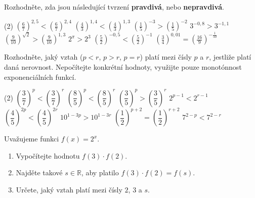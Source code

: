 \documentclass[12pt,a4paper]{article}
\begin{document}
\begin{exercise}
Rozhodněte, zda jsou následující tvrzení \textbf{pravdivá}, nebo \textbf{nepravdivá}.

\begin{tasks}(2)
    \task $\left(\frac{6}{7}\right)^{2{,}5} < \left(\frac{6}{7}\right)^{2{,}4}$
    \task $\left(\frac{4}{3}\right)^{1{,}4} < \left(\frac{4}{3}\right)^{1{,}3}$
    \task $\left(\frac{1}{5}\right)^{-3} > \left(\frac{1}{5}\right)^{-2}$
    \task $3^{-0{,}8} > 3^{-1{,}1}$
    \task $\left(\frac{9}{10}\right)^{\sqrt{2}} > \left(\frac{9}{10}\right)^{1{,}3}$
    \task $2^{\pi} > 2^{3}$
    \task $\left(\frac{5}{2}\right)^{-0{,}5} < \left(\frac{5}{2}\right)^{-1}$
    \task $\left(\frac{3}{4}\right)^{0{,}01} = \left(\frac{16}{9}\right)^{-\frac{1}{50}}$
\end{tasks}
\end{exercise}


\begin{exercise}
Rozhodněte, jaký vztah ($p<r$, $p>r$, $p=r$) platí mezi čísly $p$ a $r$,
jestliže platí daná nerovnost. Nepočítejte konkrétní hodnoty, využijte pouze
monotónnost exponenciálních funkcí.

\begin{tasks}(2)
    \task $\left(\dfrac{3}{7}\right)^{p} < \left(\dfrac{3}{7}\right)^{r}$
    \task $\left(\dfrac{8}{5}\right)^{p} < \left(\dfrac{8}{5}\right)^{r}$
    \task $\left(\dfrac{3}{5}\right)^{p} > \left(\dfrac{3}{5}\right)^{r}$
    \task $2^{p-1} < 2^{r-1}$
    \task $\left(\dfrac{4}{5}\right)^{2p} < \left(\dfrac{4}{5}\right)^{2r}$
    \task $10^{1-3p} > 10^{1-3r}$
    \task $\left(\dfrac{1}{2}\right)^{p+2} = \left(\dfrac{1}{2}\right)^{r+2}$
    \task $7^{2-p} < 7^{2-r}$
\end{tasks}
\end{exercise}


\begin{exercise}

Uvažujeme funkci $f(x)=2^{x}$.

\begin{enumerate}[label=\arabic*.]
    \item Vypočítejte hodnotu $f(3)\cdot f(2)$.
    \item Najděte takové $s\in\mathbb{R}$, aby platilo $f(3)\cdot f(2)=f(s)$.
    \item Určete, jaký vztah platí mezi čísly $2$, $3$ a $s$.
\end{enumerate}
\end{exercise}
\end{document}
